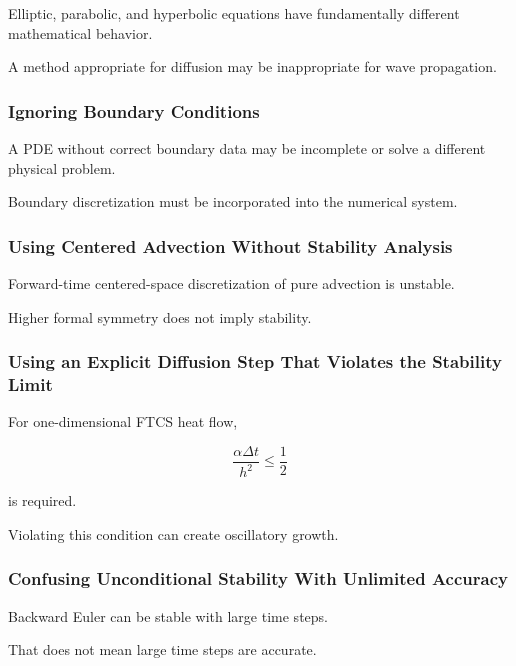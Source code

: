 Elliptic, parabolic, and hyperbolic equations have fundamentally different
mathematical behavior.

A method appropriate for diffusion may be inappropriate for wave
propagation.

\subsubsection{Ignoring Boundary Conditions}

A PDE without correct boundary data may be incomplete or solve a different
physical problem.

Boundary discretization must be incorporated into the numerical system.

\subsubsection{Using Centered Advection Without Stability Analysis}

Forward-time centered-space discretization of pure advection is unstable.

Higher formal symmetry does not imply stability.

\subsubsection{Using an Explicit Diffusion Step That Violates the Stability Limit}

For one-dimensional FTCS heat flow,

\[
\boxed{
\frac{
\alpha\Delta t
}{
h^2
}
\leq
\frac12
}
\]

is required.

Violating this condition can create oscillatory growth.

\subsubsection{Confusing Unconditional Stability With Unlimited Accuracy}

Backward Euler can be stable with large time steps.

That does not mean large time steps are accurate.

